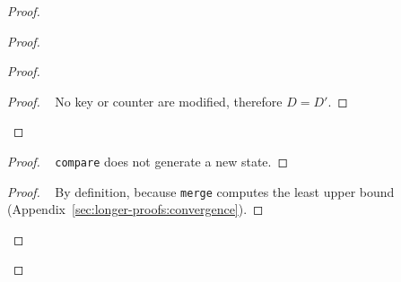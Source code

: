 \documentclass[11pt, oneside]{article}   	%
\begin{document}
\begin{proof}
\begin{proof}
\begin{proof}
			\begin{proof}
				\pf~ No key or counter are modified, therefore $D=D'$.
			\end{proof}
		\end{proof}
		
		\begin{proof}
			\pf~ \texttt{compare} does not generate a new state.
		\end{proof}
		
		\begin{proof}
			\pf~ By definition, because \texttt{merge} computes the least upper bound (Appendix~\ref{sec:longer-proofs:convergence}).
		\end{proof}
%
	\end{proof}	
\end{proof}
\end{document}
